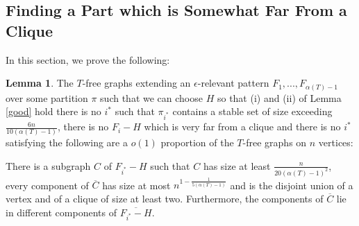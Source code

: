 \documentclass[12pt]{article}
\theoremstyle{definition}
\newtheorem{lemma}[theorem]{Lemma}
\begin{document}
 
 
 
 \subsection{Finding a Part which is Somewhat Far From a Clique}
 

 
 In this section,  we prove the following: 


\begin{lemma}\label{nobigstable}
The  $T$-free  graphs extending an $\epsilon$-relevant pattern $F_1,...,F_{\alpha(T)-1}$  over some partition $\pi$ such that we can choose $H$ so that  (i) and (ii) of Lemma \ref{good} hold  there is no   $i^*$    such that $\pi_{i^*}$  contains  a stable set of size exceeding $ \frac{6n}{10(\alpha(T)-1)}$, there is no $F_i-H$ which is very far from a clique  
 and  there is no  $i^*$ satisfying the following are   a $o(1)$ proportion of the $T$-free graphs on $n$ vertices:
 
There is a subgraph $C$  of $F_{i^*}-H$  such that   $C$ has size at least $\frac{n}{20(\alpha(T)-1)^2}$, 
every  component of $\overline{C}$ has size  at most  $n^{1-\frac{1}{5(\alpha(T)-1)}}$  and is the disjoint union of a vertex and of a clique of size at least two.
Furthermore, the components of $\overline{C}$ lie in different components of $\overline{F_{i^*}-H}$.
 \end{lemma}
\end{document}
